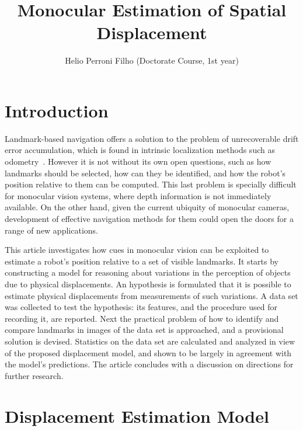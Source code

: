 \documentclass[twocolumn, 9pt]{jsproceedings}
\title{Monocular Estimation of Spatial Displacement}
\author{Helio Perroni Filho (Doctorate Course, 1st year)\authorrefmark{1}}
\affiliation{Intelligent Robotics Laboratory, OHYA's group}
\begin{document}
\thispagestyle{myheadings}
\maketitle


\section{Introduction}

Landmark-based navigation offers a solution to the problem of unrecoverable drift error accumulation, which is found in intrinsic localization methods such as odometry~\cite{marsland01}. However it is not without its own open questions, such as how landmarks should be selected, how can they be identified, and how the robot's position relative to them can be computed. This last problem is specially difficult for monocular vision systems, where depth information is not immediately available. On the other hand, given the current ubiquity of monocular cameras, development of effective navigation methods for them could open the doors for a range of new applications.

This article investigates how cues in monocular vision can be exploited to estimate a robot's position relative to a set of visible landmarks. It starts by constructing a model for reasoning about variations in the perception of objects due to physical displacements. An hypothesis is formulated that it is possible to estimate physical displacements from measurements of such variations. A data set was collected to test the hypothesis: its features, and the procedure used for recording it, are reported. Next the practical problem of how to identify and compare landmarks in images of the data set is approached, and a provisional solution is devised. Statistics on the data set are calculated and analyzed in view of the proposed displacement model, and shown to be largely in agreement with the model's predictions. The article concludes with a discussion on directions for further research.

\section{Displacement Estimation Model}
\end{document}

